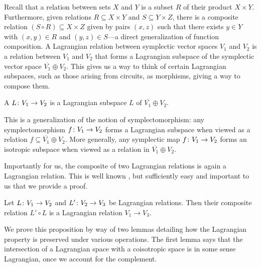 Recall that a relation between sets $X$ and $Y$ is a subset $R$ of their product
$X \times Y$. Furthermore, given relations $R \subseteq X \times Y$ and $S
\subseteq Y \times Z$, there is a composite relation $(S \circ R) \subseteq X
\times Z$ given by pairs $(x,z)$ such that there exists $y \in Y$ with $(x,y)
\in R$ and $(y,z) \in S$---a direct generalization of function composition. A
Lagrangian relation between symplectic vector spaces $V_1$ and $V_2$ is a
relation between $V_1$ and $V_2$ that forms a Lagrangian subspace of the
symplectic vector space $\overline{V_1} \oplus V_2$. This gives us a
way to think of certain Lagrangian subspaces, such as those arising from
circuits, as morphisms, giving a way to compose them.

\begin{definition}
  A  $L{\colon} V_1 \to V_2$ is a Lagrangian subspace $L$
  of $\overline{V_1} \oplus V_2$. 
\end{definition}

This is a generalization of the notion of symplectomorphism: any symplectomorphism
$f{\colon} V_1 \to V_2$ forms a Lagrangian subspace when viewed as a
relation $f \subseteq \overline{V_1} \oplus V_2$. More generally, any symplectic
map $f{\colon} V_1 \to V_2$ forms an isotropic subspace when viewed as a relation in
$\overline{V_1} \oplus V_2$. 

Importantly for us, the composite of two Lagrangian relations is again a
Lagrangian relation.  This is well known \cite{Weinstein}, but sufficiently 
easy and important to us that we provide a proof.

\begin{proposition} \label{prop:lagrangian_composition}
  Let $L{\colon} V_1 \to V_2$ and $L'{\colon} V_2 \to V_3$ be Lagrangian relations. Then their
  composite relation $L' \circ L$ is a Lagrangian relation $V_1 \to V_3$.
\end{proposition}

We prove this proposition by way of two lemmas detailing how the Lagrangian
property is preserved under various operations. The first lemma says that the
intersection of a Lagrangian space with a coisotropic space is in some sense
Lagrangian, once we account for the complement.

